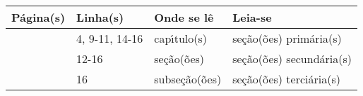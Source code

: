 

\begin{errata}%
\begin{table*}[Htb]%
\begin{tabularx}{\textwidth}{|l|l|X|X|}%
\toprule
\textbf{P\'agina(s)}         & \textbf{Linha(s)} & \textbf{Onde se l\^e} & \textbf{Leia-se}         \\ \midrule
\pageref*{errata:capitulo} & 4, 9-11, 14-16    & cap\'{\i}tulo(s)         & se\c{c}\~ao(\~oes) prim\'aria(s)   \\ \midrule
\pageref*{errata:secao}    & 12-16             & se\c{c}\~ao(\~oes)          & se\c{c}\~ao(\~oes) secund\'aria(s) \\ \midrule
\pageref*{errata:subsecao} & 16                & subse\c{c}\~ao(\~oes)       & se\c{c}\~ao(\~oes) terci\'aria(s)  \\ \bottomrule
\end{tabularx}
\end{table*}
\end{errata}
